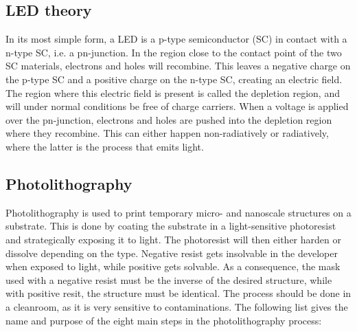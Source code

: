 
\subsection{LED theory}
\label{LEDtheory}

In its most simple form, a LED is a p-type semiconductor (SC) in contact with a n-type SC, i.e. a pn-junction.
In the region close to the contact point of the two SC materials, electrons and holes will recombine.
This leaves a negative charge on the p-type SC and a positive charge on the n-type SC, creating an electric field.
The region where this electric field is present is called the depletion region, and will under normal conditions be free of charge carriers.
When a voltage is applied over the pn-junction, electrons and holes are pushed into the depletion region where they recombine.
This can either happen non-radiatively or radiatively, where the latter is the process that emits light.




\subsection{Photolithography}
\label{photolithography}

Photolithography is used to print temporary micro- and nanoscale structures on a substrate.
This is done by coating the substrate in a light-sensitive photoresist and strategically exposing it to light.
The photoresist will then either harden or dissolve depending on the type.
Negative resist gets insolvable in the developer when exposed to light, while positive gets solvable.
As a consequence, the mask used with a negative resist must be the inverse of the desired structure, while with positive resit, the structure must be identical.
The process should be done in a cleanroom, as it is very sensitive to contaminations.
The following list gives the name and purpose of the eight main steps in the photolithography process:

